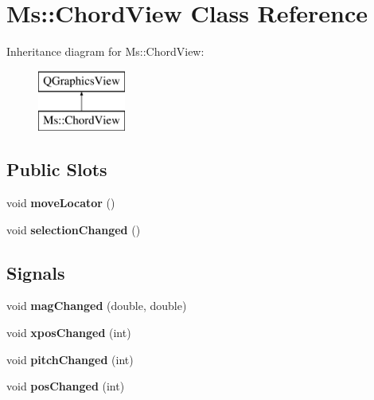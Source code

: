 \hypertarget{class_ms_1_1_chord_view}{}\section{Ms\+:\+:Chord\+View Class Reference}
\label{class_ms_1_1_chord_view}
Inheritance diagram for Ms\+:\+:Chord\+View\+:\begin{figure}[H]
\begin{center}
\leavevmode
\includegraphics[height=2.000000cm]{class_ms_1_1_chord_view}
\end{center}
\end{figure}
\subsection*{Public Slots}
\begin{DoxyCompactItemize}
\item 
\mbox{\label{class_ms_1_1_chord_view_a397085fe3af1e302dd63203303958014}} 
void {\bfseries move\+Locator} ()
\item 
\mbox{\label{class_ms_1_1_chord_view_aab21e82873fb701220896c609d788f3f}} 
void {\bfseries selection\+Changed} ()
\end{DoxyCompactItemize}
\subsection*{Signals}
\begin{DoxyCompactItemize}
\item 
\mbox{\label{class_ms_1_1_chord_view_a80f0de96387eef04f2d88d69d5ad25e9}} 
void {\bfseries mag\+Changed} (double, double)
\item 
\mbox{\label{class_ms_1_1_chord_view_aca1d9bc4d282cd6909d67656a1fca62c}} 
void {\bfseries xpos\+Changed} (int)
\item 
\mbox{\label{class_ms_1_1_chord_view_a4460b8e6865c74489852d9399c9a2160}} 
void {\bfseries pitch\+Changed} (int)
\item 
\mbox{\label{class_ms_1_1_chord_view_a81b0c557bd90a966c7b0dad9d3d80429}} 
void {\bfseries pos\+Changed} (int)
\end{DoxyCompactItemize}
